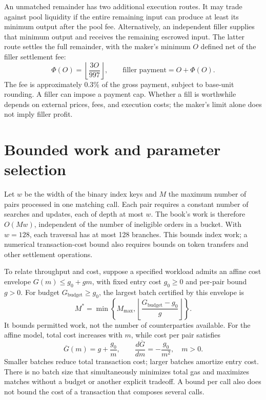 \documentclass{article}
\begin{document}
An unmatched remainder has two additional execution routes. It may trade against pool
liquidity if the entire remaining input can produce at least its minimum output after the
pool fee. Alternatively, an independent filler supplies that minimum output and receives
the remaining escrowed input. The latter route settles the full remainder, with the maker's
minimum $O$ defined net of the filler settlement fee:
\begin{equation}
 \Phi(O)=\left\lfloor\frac{3O}{997}\right\rfloor,\qquad
 \text{filler payment}=O+\Phi(O).
\end{equation}
The fee is approximately $0.3\%$ of the gross payment, subject to base-unit rounding.
A filler can impose a payment cap. Whether a fill is worthwhile depends on external prices,
fees, and execution costs; the maker's limit alone does not imply filler profit.

\section{Bounded work and parameter selection}

Let $w$ be the width of the binary index keys and $M$ the maximum number of pairs processed
in one matching call. Each pair requires a constant number of searches and updates, each
of depth at most $w$. The book's work is therefore $O(Mw)$, independent of the number of
ineligible orders in a bucket. With $w=128$, each traversal has at most 128 branches.
This bounds index work; a numerical transaction-cost bound also requires bounds on token
transfers and other settlement operations.

To relate throughput and cost, suppose a specified workload admits an affine cost envelope
$G(m)\le g_0+gm$, with fixed entry cost $g_0\ge0$ and per-pair bound $g>0$.
For budget $G_{\mathrm{budget}}\ge g_0$, the largest batch certified by this envelope is
\begin{equation}
 M^*=\min\left\{M_{\max},\left\lfloor\frac{G_{\mathrm{budget}}-g_0}{g}\right\rfloor\right\}.
 \label{eq:budget}
\end{equation}
It bounds permitted work, not the number of counterparties available. For the affine model,
total cost increases with $m$, while cost per pair satisfies
\begin{equation}
 \overline G(m)=g+\frac{g_0}{m},\qquad
 \frac{d\overline G}{dm}=-\frac{g_0}{m^2},\quad m>0.
\end{equation}
Smaller batches reduce total transaction cost; larger batches amortize entry cost. There
is no batch size that simultaneously minimizes total gas and maximizes matches without a
budget or another explicit tradeoff. A bound per call also does not bound the cost of a
transaction that composes several calls.
\end{document}
